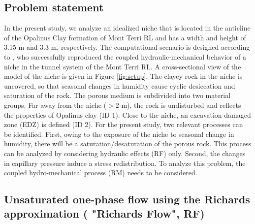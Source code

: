 \subsection{Problem statement}
In the present study, we analyze an idealized niche that is located in the anticline of the Opalinus Clay formation of Mont Terri RL and has a width and height of 3.15 m and 3.3 m, respectively. The computational scenario is designed according to \cite{ziefle2018}, who successfully reproduced the coupled hydraulic-mechanical behavior of a niche in the tunnel system of the Mont Terri RL.   A cross-sectional view of the model of the niche is given in Figure \ref{fig:setup}. The clayey rock in the niche is uncovered, so that seasonal changes in humidity cause cyclic desiccation and saturation of the rock. The porous medium is subdivided into two material groups. Far away from the niche ($> 2$ m), the rock is undisturbed and reflects the properties of Opalinus clay (ID 1). Close to the niche, an excavation damaged zone (EDZ) is defined (ID 2). For the present study, two relevant processes can be identified. First, owing to the exposure of the niche to seasonal change in humidity, there will be a saturation/desaturation of the porous rock. This process can be analyzed by considering hydraulic effects (RF) only. Second, the changes in capillary pressure induce a stress redistribution. To analyze this problem, the coupled hydro-mechanical process (RM) needs to be considered.

\subsection{Unsaturated one-phase flow using the Richards approximation ( "Richards Flow", RF)}\label{sec:RF}
